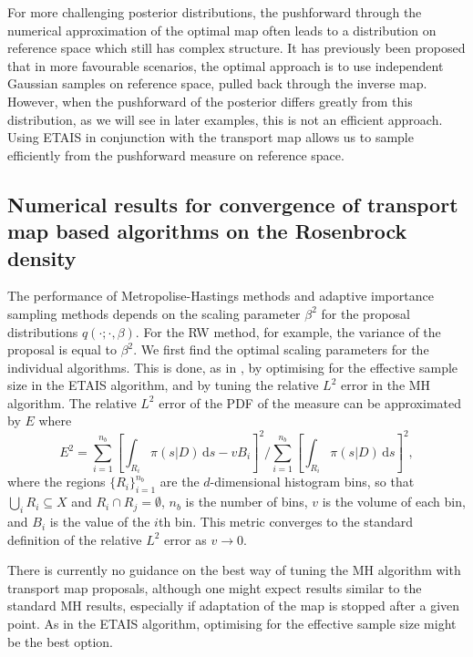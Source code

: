 \documentclass[final]{siamltex}
\newcommand{\edit}[1]{#1}
\begin{document}
\edit{For more challenging posterior distributions, the pushforward
  through the numerical
approximation of the optimal map often leads to a distribution on
reference space which still has complex structure. It has previously
been proposed that in more favourable scenarios, the optimal approach
is to use independent Gaussian samples on reference space, pulled back
through the inverse map. However, when the pushforward of the
posterior differs greatly from this distribution, as we will see in
later examples, this is not an
efficient approach. Using ETAIS in conjunction with the transport map
allows us to sample efficiently from the pushforward measure on
reference space.}

\subsection[Numerical results]{Numerical results for convergence of
  transport map based algorithms on the Rosenbrock density}
\edit{The performance of Metropolise-Hastings methods and adaptive
importance sampling methods depends on the scaling parameter
$\beta^2$ for the proposal distributions $q(\cdot ;
\cdot, \beta)$. For the RW method, for example, the variance of the
proposal is equal to $\beta^2$.}
We first find the optimal scaling parameters for the individual
algorithms. This is done, as in \cite{cotter2015parallel}, by optimising for the effective sample size in
the ETAIS algorithm, and by tuning the relative $L^2$ error in the MH
algorithm. 
\edit{The relative $L^2$ error of the PDF of the measure can be
  approximated by $E$ where
\begin{equation}\label{eqn:L2_error}
	E^2 = \sum\limits_{i=1}^{n_b}\left[\displaystyle\int_{R_i} \! \pi(s|D) \, \mbox{d}s - vB_i\right]^2 \Big/ \sum\limits_{i=1}^{n_b}\left[\displaystyle\int_{R_i} \! \pi(s|D) \, \mbox{d}s\right]^2,
\end{equation}
where the regions $\{R_i\}_{i=1}^{n_b}$ are the $d$-dimensional
histogram bins, so that $\bigcup_i R_i \subseteq X$ and
$R_i\cap R_j=\emptyset$, $n_b$ is the number of bins, $v$ is the
volume of each bin, and $B_i$ is the value of the $i$th bin. This
metric converges to the standard definition of the relative $L^2$
error as $v\rightarrow 0$.}

There is currently no
guidance on the best way of tuning the MH algorithm with transport map
proposals, although one might expect results similar to the standard MH
results, especially if adaptation of the map is stopped after a given
point. As in the ETAIS algorithm, optimising for the effective sample size might be the best option.
\end{document}
